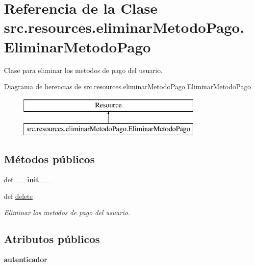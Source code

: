 \hypertarget{classsrc_1_1resources_1_1eliminar_metodo_pago_1_1_eliminar_metodo_pago}{\section{Referencia de la Clase src.\-resources.\-eliminar\-Metodo\-Pago.\-Eliminar\-Metodo\-Pago}
\label{classsrc_1_1resources_1_1eliminar_metodo_pago_1_1_eliminar_metodo_pago}
}


Clase para eliminar los metodos de pago del usuario.  


Diagrama de herencias de src.\-resources.\-eliminar\-Metodo\-Pago.\-Eliminar\-Metodo\-Pago\begin{figure}[H]
\begin{center}
\leavevmode
\includegraphics[height=2.000000cm]{classsrc_1_1resources_1_1eliminar_metodo_pago_1_1_eliminar_metodo_pago}
\end{center}
\end{figure}
\subsection*{Métodos públicos}
\begin{DoxyCompactItemize}
\item 
\hypertarget{classsrc_1_1resources_1_1eliminar_metodo_pago_1_1_eliminar_metodo_pago_a7c17412dce670194256008c19c7e04ee}{def {\bfseries \-\_\-\-\_\-init\-\_\-\-\_\-}}\label{classsrc_1_1resources_1_1eliminar_metodo_pago_1_1_eliminar_metodo_pago_a7c17412dce670194256008c19c7e04ee}

\item 
def \hyperlink{classsrc_1_1resources_1_1eliminar_metodo_pago_1_1_eliminar_metodo_pago_a9a5cb6d036b922d9635e4b5a5b7f9cbe}{delete}
\begin{DoxyCompactList}\small\item\em Eliminar los metodos de pago del usuario. \end{DoxyCompactList}\end{DoxyCompactItemize}
\subsection*{Atributos públicos}
\begin{DoxyCompactItemize}
\item 
\hypertarget{classsrc_1_1resources_1_1eliminar_metodo_pago_1_1_eliminar_metodo_pago_a6e0a27cd8bb55cdf80c3457e090924bb}{{\bfseries autenticador}}\label{classsrc_1_1resources_1_1eliminar_metodo_pago_1_1_eliminar_metodo_pago_a6e0a27cd8bb55cdf80c3457e090924bb}

\end{DoxyCompactItemize}
